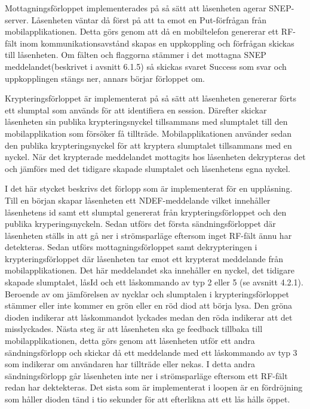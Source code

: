 \documentclass[11pt]{article}
\begin{document}
Mottagningsförloppet implementerades på så sätt att låsenheten agerar SNEP-server. Låsenheten väntar då först på att ta emot en Put-förfrågan från mobilapplikationen. Detta görs genom att då en mobiltelefon genererar ett RF-fält inom kommunikationsavstånd skapas en uppkoppling och förfrågan skickas till låsenheten. Om fälten och flaggorna stämmer i det mottagna SNEP meddelandet(beskrivet i avsnitt 6.1.5) så skickas svaret Success som svar och uppkopplingen stängs ner, annars börjar förloppet om.

Krypteringsförloppet är implementerat på så sätt att låsenheten genererar förts ett slumptal som används för att identifiera en session. Därefter skickar låsenheten sin publika krypteringsnyckel tillsammans med slumptalet till den mobilapplikation som försöker få tillträde. Mobilapplikationen använder sedan den publika krypteringsnyckel för att kryptera slumptalet tillsammans med en nyckel. När det krypterade meddelandet mottagits hos låsenheten dekrypteras det och jämförs med det tidigare skapade slumptalet och låsenhetens egna nyckel.

I det här stycket beskrivs det förlopp som är implementerat för en upplåsning. Till en början skapar låsenheten ett NDEF-meddelande vilket innehåller låsenhetens id samt ett slumptal genererat från krypteringsförloppet och den publika kryperingsnyckeln. Sedan utförs det första sändningsförloppet där låsenheten ställs in att gå ner i strömsparläge eftersom inget RF-fält ännu har detekteras. Sedan utförs mottagningsförloppet samt dekrypteringen i krypteringsförloppet där låsenheten tar emot ett krypterat meddelande från mobilapplikationen. Det här meddelandet ska innehåller en nyckel, det tidigare skapade slumptalet, låsId och ett låskommando av typ 2 eller 5 (se avsnitt 4.2.1). Beroende av om jämförelsen av nycklar och slumptalen i krypteringsförloppet stämmer eller inte kommer en grön eller en röd diod att börja lysa. Den gröna dioden indikerar att låskommandot lyckades medan den röda indikerar att det misslyckades. Nästa steg är att låsenheten ska ge feedback tillbaka till mobilapplikationen, detta görs genom att låsenheten utför ett andra sändningsförlopp och skickar då ett meddelande med ett låskommando av typ 3 som indikerar om användaren har tillträde eller nekas. I detta andra sändningsförlopp går låsenheten inte ner i strömsparläge eftersom ett RF-fält redan har dektekteras. Det sista som är implementerat i loopen är en fördröjning som håller dioden tänd i tio sekunder för att efterlikna att ett lås hålls öppet.
\end{document}
